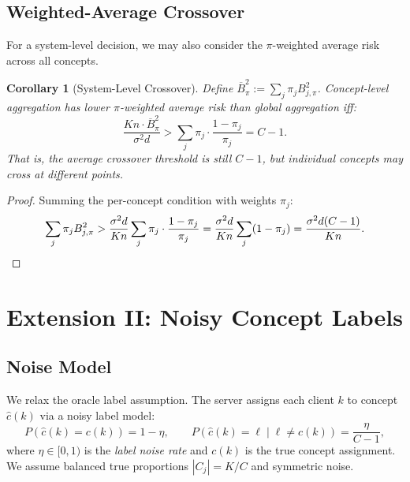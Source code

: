 \documentclass[11pt,a4paper]{article}
\newtheorem{corollary}[theorem]{Corollary}
\begin{document}
\subsection{Weighted-Average Crossover}

For a system-level decision, we may also consider the $\pi$-weighted average risk across all concepts.

\begin{corollary}[System-Level Crossover]\label{cor:system-level}
Define $\overline{B}^2_\pi := \sum_j \pi_j B_{j,\pi}^2$. Concept-level aggregation has lower $\pi$-weighted average risk than global aggregation iff:
\begin{equation}
\frac{Kn \cdot \overline{B}^2_\pi}{\sigma^2 d} > \sum_j \pi_j \cdot \frac{1-\pi_j}{\pi_j} = C - 1.
\end{equation}
That is, the \emph{average} crossover threshold is still $C - 1$, but individual concepts may cross at different points.
\end{corollary}

\begin{proof}
Summing the per-concept condition with weights $\pi_j$:
\[
\sum_j \pi_j B_{j,\pi}^2 > \frac{\sigma^2 d}{Kn} \sum_j \pi_j \cdot \frac{1-\pi_j}{\pi_j}
= \frac{\sigma^2 d}{Kn} \sum_j (1 - \pi_j) = \frac{\sigma^2 d(C-1)}{Kn}. \qedhere
\]
\end{proof}


\section{Extension II: Noisy Concept Labels}

\subsection{Noise Model}

We relax the oracle label assumption. The server assigns each client $k$ to concept $\hat{c}(k)$ via a noisy label model:
\begin{equation}\label{eq:noise-model}
P(\hat{c}(k) = c(k)) = 1 - \eta, \qquad P(\hat{c}(k) = \ell \mid \ell \neq c(k)) = \frac{\eta}{C - 1},
\end{equation}
where $\eta \in [0, 1)$ is the \emph{label noise rate} and $c(k)$ is the true concept assignment. We assume balanced true proportions $|C_j| = K/C$ and symmetric noise.
\end{document}
